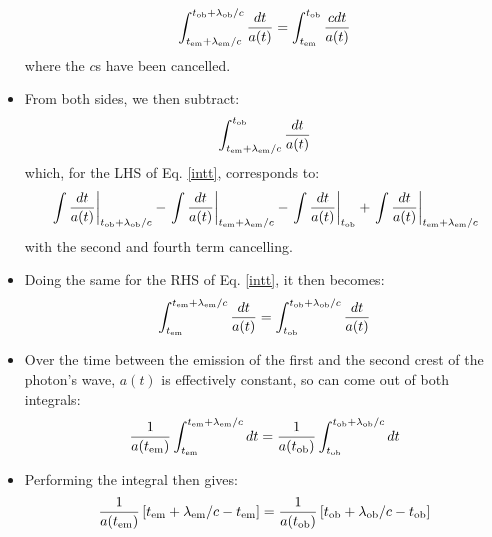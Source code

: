 \documentclass[11pt]{article}
\begin{document}
\begin{itemize}
\begin{equation}
    \label{intt}
    \int_{t_{\rm em}+\lambda_{\rm em}/c}^{t_{\rm ob}+\lambda_{\rm ob}/c}\frac{dt}{a(t)}=\int_{t_{\rm em}}^{t_{\rm ob}}\frac{cdt}{a(t)}
\end{equation}
where the $c$s have been cancelled. 
\item From both sides, we then subtract:
\begin{equation}
    \int_{t_{\rm em}+\lambda_{\rm em}/c}^{t_{\rm ob}}\frac{dt}{a(t)}
\end{equation}
which, for the LHS of Eq. \ref{intt}, corresponds to:
\begin{equation}
    \left.\int\frac{dt}{a(t)} \right|_{t_{\rm ob}+\lambda_{\rm ob}/c} - \left.\int\frac{dt}{a(t)} \right|_{t_{\rm em}+\lambda_{\rm em}/c} - 
    \left.\int\frac{dt}{a(t)} \right|_{t_{\rm ob}} +
    \left.\int\frac{dt}{a(t)} \right|_{t_{\rm em}+\lambda_{\rm em}/c}
\end{equation}
with the second and fourth term cancelling.
\item Doing the same for the RHS of Eq. \ref{intt}, it then becomes:
\begin{equation}
    \int^{t_{\rm em}+\lambda_{\rm em}/c}_{t_{\rm em}}\frac{dt}{a(t)}=
    \int_{t_{\rm ob}}^{t_{\rm ob}+\lambda_{\rm ob}/c}\frac{dt}{a(t)}
\end{equation}    

\item Over the time between the emission of the first and the second crest of the photon's wave, $a(t)$ is effectively constant, so can come out of both integrals:
\begin{equation}
    \frac{1}{a(t_{\rm em})}\int^{t_{\rm em}+\lambda_{\rm em}/c}_{t_{\rm em}}dt=\frac{1}{a(t_{\rm ob})}\int_{t_{\rm ob}}^{t_{\rm ob}+\lambda_{\rm ob}/c}dt
\end{equation}

\item Performing the integral then gives:
\begin{equation}
    \frac{1}{a(t_{\rm em})}\left[t_{\rm em}+\lambda_{\rm em}/c - t_{\rm em}\right]=\frac{1}{a(t_{\rm ob})}\left[t_{\rm ob}+\lambda_{\rm ob}/c - t_{\rm ob}\right]
\end{equation}



\end{itemize}
\end{document}
